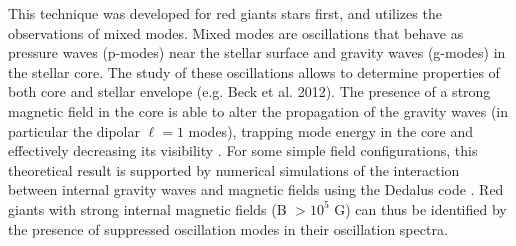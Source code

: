 This technique was developed for red giants stars first, and utilizes the observations of mixed modes. Mixed modes are
oscillations that behave as pressure waves (p-modes) near the stellar surface and gravity waves (g-modes) in the stellar core.
The study of these oscillations allows to determine properties of both core and stellar envelope (e.g. Beck et al. 2012).
The presence of a strong magnetic field in the core is able to alter the propagation of the gravity waves (in particular the dipolar $\ell =1$ modes),
trapping mode energy in the core and effectively decreasing its visibility \citep{Fuller_2015}.
For some simple field configurations, this theoretical result is supported  by numerical simulations of the interaction between
internal gravity waves and magnetic fields using the Dedalus code \citep{Lecoanet_2016}.
Red giants with strong internal magnetic fields (B $> 10^5$ G) can thus be identified by the presence of suppressed oscillation modes in their oscillation spectra.
